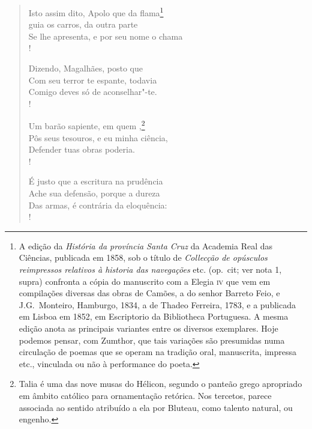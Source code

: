 \begin{verse}
Isto assim dito, Apolo que da flama\footnote{ A edição da \textit{História da
província Santa Cruz} da Academia Real das Ciências, publicada em 1858,
sob o título de \textit{Collecção de opúsculos reimpressos relativos à historia
das navegações} etc. (op.~cit; ver nota 1, supra) confronta a cópia do
manuscrito com a Elegia \textsc{iv} que vem em compilações diversas das obras de
Camões, a do senhor Barreto Feio, e J.G.~Monteiro, Hamburgo, 1834, a de
Thadeo Ferreira, 1783, e a publicada em Lisboa em 1852, em Escriptorio
da Bibliotheca Portuguesa. A mesma edição anota as principais variantes
entre os diversos exemplares. Hoje podemos pensar, com Zumthor, que
tais variações são presumidas numa circulação de poemas que se operam
na tradição oral, manuscrita, impressa etc., vinculada ou não à performance do poeta.}\\
 guia os carros, da outra parte\\  
Se lhe apresenta, e por seu nome o chama\\!

Dizendo, Magalhães, posto que \\  			%
Com seu terror te espante, todavia\\
Comigo deves só de aconselhar"-te.\\!

Um barão sapiente, em quem ,\footnote{ Talia é uma das nove musas do
Hélicon, segundo o panteão grego apropriado em âmbito católico para
ornamentação retórica. Nos tercetos, parece associada ao sentido
atribuído a ela por Bluteau, como talento natural, ou engenho.}\\
Pôs seus tesouros, e eu minha ciência,\\
Defender tuas obras poderia.\\!

É justo que a escritura na prudência\\
Ache sua defensão, porque a dureza\\
Das armas, é contrária da eloquência:\\!


\end{verse}

